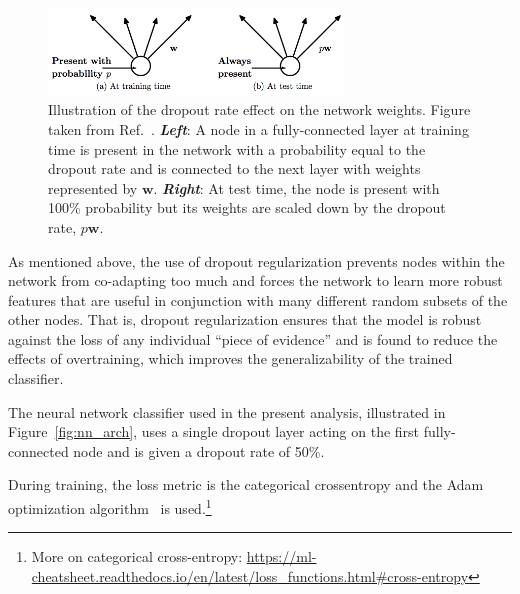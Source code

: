 \begin{figure}[!htb]
    \begin{center}
        \includegraphics[width=0.7\textwidth]{figures/search_hh/mva/dropout_weight_scaling}
        \caption{
            Illustration of the dropout rate effect on the network weights. Figure taken from Ref.~\cite{JMLRDropout}.
            \textit{\textbf{Left}}: A node in a fully-connected layer at training time is present in the network with
                a probability equal to the dropout rate and is connected to the next layer with weights represented by $\bm{w}$.
            \textit{\textbf{Right}}: At test time, the node is present with 100\% probability but its weights are scaled down by the
                dropout rate, $p\bm{w}$.
        }
        \label{fig:dropout_weight_scaling}
    \end{center}
\end{figure}

\noindent
As mentioned above, the use of dropout regularization prevents nodes within the network from co-adapting
too much and forces the network to learn more robust features that are useful in conjunction with many 
different random subsets of the other nodes.
That is, dropout regularization ensures that the model is robust against the loss of any individual
``piece of evidence'' and is found to reduce the effects of overtraining, which improves the generalizability
of the trained classifier.

The neural network classifier used in the present analysis, illustrated in Figure~\ref{fig:nn_arch},
uses a single dropout layer acting on the first fully-connected node and is given a dropout rate of 50\%.

During training, the loss metric is the categorical crossentropy and the Adam optimization algorithm~\cite{AdamOptimizer} is used.\footnote{More
on categorical cross-entropy: \href{https://ml-cheatsheet.readthedocs.io/en/latest/loss_functions.html\#cross-entropy}
{https://ml-cheatsheet.readthedocs.io/en/latest/loss\_functions.html\#cross-entropy}}


%
%
